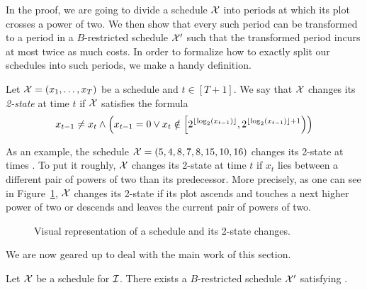 In the proof, we are going to divide a schedule $\mathcal{X}$ into periods at which its plot crosses a power of two. We then show that every such period can be transformed to a period in a $B$-restricted schedule $\mathcal{X}'$ such that the transformed period incurs at most twice as much costs. In order to formalize how to exactly split our schedules into such periods, we make a handy definition.
\begin{defn}
Let $\mathcal{X}=(x_1,\dotsc,x_T)$ be a schedule and $t\in[T+1]$. We say that $\mathcal{X}$ changes its \emph{2-state} at time $t$ if $\mathcal{X}$ satisfies the formula
\begin{equation*}
	x_{t-1}\neq x_t\land \left(x_{t-1}=0 \lor x_t\notin\left[2^{\lfloor\log_2(x_{t-1})\rfloor},2^{\lfloor\log_2(x_{t-1})\rfloor+1}\right)\right)
\end{equation*}
\end{defn}
As an example, the schedule $\mathcal{X}=(5,4,8,7,8,15,10,16)$ changes its 2-state at times . To put it roughly, $\mathcal{X}$ changes its 2-state at time $t$ if $x_t$ lies between a different pair of powers of two than its predecessor. More precisely, as one can see in Figure~\ref{fig:schedule_2_states}, $\mathcal{X}$ changes its 2-state if its plot ascends and touches a next higher power of two or descends and leaves the current pair of powers of two.
\begin{figure}[H]
\centering

\caption{Visual representation of a schedule and its 2-state changes.}
\label{fig:schedule_2_states}
\end{figure}
We are now geared up to deal with the main work of this section.
\begin{lem}\label{lem:transform_schedule_approx_2}
Let $\mathcal{X}$ be a schedule for $\mathcal{I}$. There exists a $B$-restricted schedule $\mathcal{X}'$ satisfying .
\end{lem}
